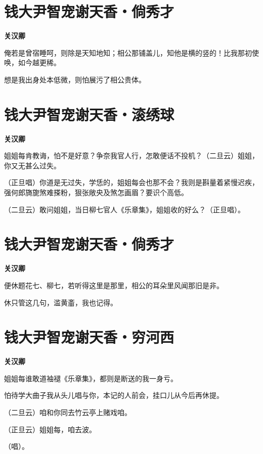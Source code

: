 \documentclass[12pt,a4paper]{ctexbook}
\begin{document}
\section{钱大尹智宠谢天香・倘秀才}
\textbf{关汉卿}\par\vspace{0.5em}
俺若是曾宿睡呵，则除是天知地知；相公那铺盖儿，知他是横的竖的！比我那初使唤，如今越更稀。\par
想是我出身处本低微，则怕展污了相公贵体。\par

\section{钱大尹智宠谢天香・滚绣球}
\textbf{关汉卿}\par\vspace{0.5em}
姐姐每肯教诲，怕不是好意？争奈我官人行，怎敢便话不投机？（二旦云）姐姐，你又无甚么过失。\par
（正旦唱）你道是无过失，学恁的，姐姐每会也那不会？我则是斟量着紧慢迟疾，强何郎旖旎煞难搽粉，狠张敞央及煞怎画眉？要识个高低。\par
（二旦云）敢问姐姐，当日柳七官人《乐章集》，姐姐收的好么？（正旦唱）。\par

\section{钱大尹智宠谢天香・倘秀才}
\textbf{关汉卿}\par\vspace{0.5em}
便休题花七、柳七，若听得这里是那里，相公的耳朵里风闻那旧是非。\par
休只管这几句，滥黄齑，我也记得。\par

\section{钱大尹智宠谢天香・穷河西}
\textbf{关汉卿}\par\vspace{0.5em}
姐姐每谁敢道袖褪《乐章集》，都则是断送的我一身亏。\par
怕待学大曲子我从头儿唱与你，本记的人前会，挂口儿从今后再休提。\par
（二旦云）咱和你同去竹云亭上赌戏咱。\par
（正旦云）姐姐每，咱去波。\par
（唱）。\par
\end{document}
